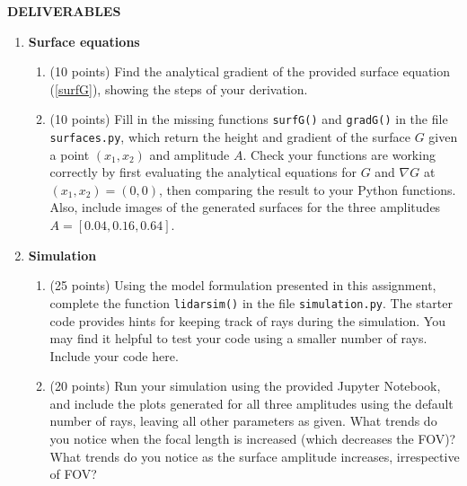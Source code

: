 \documentclass[../../me144_244_student.tex]{subfiles}
\begin{document}
\newpage
\centerline{ \bf DELIVERABLES}

\vspace{.1 in}

\begin{enumerate}
    \item \textbf{Surface equations}
    \begin{enumerate}
        \item (10 points) Find the analytical gradient of the provided surface equation
        (\ref{surfG}), showing the steps of your derivation.

        \item (10 points) Fill in the missing functions \texttt{surfG()} and \texttt{gradG()} in the
        file \texttt{surfaces.py}, which return the height and gradient of the surface $G$ given a
        point $(x_1,x_2)$ and amplitude $A$. Check your functions are working correctly by first
        evaluating the analytical equations for $G$ and $\nabla G$ at $(x_1,x_2) = (0,0)$, then
        comparing the result to your Python functions. Also, include images of the generated
        surfaces for the three amplitudes $A=[0.04,0.16,0.64]$.

    \end{enumerate}
    \item \textbf{Simulation}
    \begin{enumerate}
        \item (25 points) Using the model formulation presented in this assignment, complete the
        function \texttt{lidarsim()} in the file \texttt{simulation.py}. The starter code provides
        hints for keeping track of rays during the simulation. You may find it helpful to 
        test your code using a smaller number of rays. Include your code here.

        \item (20 points) Run your simulation using the provided Jupyter Notebook, and include the
        plots generated for all three amplitudes using the default number of rays, leaving all other
        parameters as given. What trends do you notice when the focal length is increased (which
        decreases the FOV)? What trends do you notice as the surface amplitude increases,
        irrespective of FOV?
        


\end{enumerate}
\end{enumerate}
\end{document}
